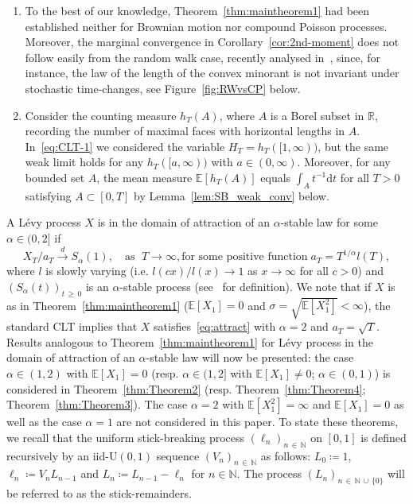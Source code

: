 \documentclass[AHL,Unicode,longabstracts,published]{cedram}
\newcommand\N{\mathbb{N}}
\newcommand\R{\mathbb{R}}
\newcommand\E{\mathds{E}}
\newcommand\1{\mathds{1}}
\newcommand\D{\mathrm{d}}
\newcommand\U{\mathrm{U}}
\newcommand\cid{\xrightarrow{d}}
\begin{document}
\begin{rema}
\begin{enumerate}
\item\label{rema1.3.v} To the best of our knowledge, Theorem~\ref{thm:maintheorem1} had been established neither for Brownian motion nor compound Poisson processes. Moreover, the marginal convergence in Corollary~\ref{cor:2nd-moment} does not follow easily from the random walk case, recently analysed in~\cite{RWpaper}, since, for instance, the law of the length of the convex minorant is not invariant under stochastic time-changes, see Figure~\ref{fig:RWvsCP} below. 
\item\label{rema1.3.vi} Consider the counting measure $h_T(A)$, where $A$ is a Borel subset in $\R$, recording the number of maximal faces with horizontal lengths in $A$. In~\eqref{eq:CLT-1} we considered the variable $H_T=h_T([1,\infty))$, but the same weak limit holds for any $h_T([a,\infty))$ with $a\in(0,\infty)$. Moreover, for any bounded set $A$, the mean measure $\E[h_T(A)]$ equals $\int_{A} t^{-1}\D t$ for all $T>0$ satisfying $A\subset [0,T]$ by Lemma~\ref{lem:SB_weak_conv} below.
\end{enumerate}
\end{rema}


A Lévy process $X$ is in the domain of attraction of an $\alpha$-stable law for some $\alpha\in(0,2]$ if
\begin{equation}\label{eq:attract}
X_{T}/a_T\cid S_\alpha(1),
\quad\text{as }\;T\to\infty, \text{for some positive function}\; a_T=T^{1/\alpha}l(T),
\end{equation}
where $l$ is slowly varying (i.e. $l(cx)/l(x)\to 1$ as $x\to\infty$ for all $c>0$) and $(S_\alpha(t))_{t\,\ge\,0}$ is an $\alpha$-stable process (see~\cite[Chapter~3]{SatoBookLevy} for definition). We note that if $X$ is as in Theorem~\ref{thm:maintheorem1} ($\E[X_1]=0$ and $\sigma=\sqrt{\E[X_1^2]}<\infty$), the standard CLT implies that $X$ satisfies~\eqref{eq:attract} with $\alpha=2$ and $a_T=\sqrt{T}$. Results analogous to Theorem~\ref{thm:maintheorem1} for Lévy process in the domain of attraction of an $\alpha$-stable law will now be presented: the case $\alpha\in(1,2)$ with $\E[X_1]=0$ (resp. $\alpha\in(1,2]$ with $\E[X_1]\ne 0$; $\alpha\in(0,1)$) is considered in Theorem~\ref{thm:Theorem2} (resp. Theorem~\ref{thm:Theorem4}; Theorem~\ref{thm:Theorem3}). The case $\alpha=2$ with $\E[X_1^2]=\infty$ and $\E [X_1]=0$ as well as the case $\alpha=1$ are not considered in this paper. To state these theorems, we recall that the uniform stick-breaking process $(\ell_n)_{n\,\in\,\N}$ on $[0,1]$ is defined recursively by an iid-$\U(0,1)$ sequence $(V_n)_{n\,\in\,\N}$ as follows: $L_0\coloneqq 1$, $\ell_n\coloneqq V_nL_{n-1}$ and $L_n\coloneqq L_{n-1}-\ell_n$ for $n\in\N$. The process $(L_n)_{n\,\in\,\N\,\cup\,\{0\}}$ will be referred to as the stick-remainders.
\end{document}
